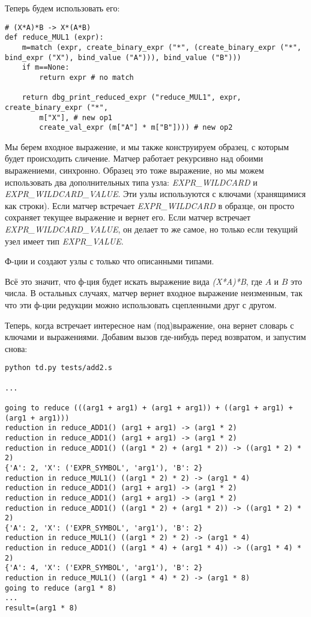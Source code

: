Теперь будем использовать его:

\begin{lstlisting}
# (X*A)*B -> X*(A*B)
def reduce_MUL1 (expr):
    m=match (expr, create_binary_expr ("*", (create_binary_expr ("*", bind_expr ("X"), bind_value ("A"))), bind_value ("B")))
    if m==None:
        return expr # no match

    return dbg_print_reduced_expr ("reduce_MUL1", expr, create_binary_expr ("*", 
        m["X"], # new op1
        create_val_expr (m["A"] * m["B"]))) # new op2
\end{lstlisting}

Мы берем входное выражение, и мы также конструируем образец, с которым будет происходить сличение.
Матчер работает рекурсивно над обоими выражениеми, синхронно.
Образец это тоже выражение, но мы можем использовать два дополнительных типа узла: \textit{EXPR\_WILDCARD} и
\textit{EXPR\_WILDCARD\_VALUE}. Эти узлы используются с ключами (хранящимися как строки).
Если матчер встречает \textit{EXPR\_WILDCARD} в образце, он просто сохраняет текущее выражение и вернет его.
Если матчер встречает \textit{EXPR\_WILDCARD\_VALUE}, он делает то же самое, но только если текущий узел имеет тип
\textit{EXPR\_VALUE}.

Ф-ции  и  создают узлы с только что описанными типами.

Всё это значит, что ф-ция  будет искать выражение вида \textit{(X*A)*B}, где $A$ и $B$
это числа. В остальных случаях, матчер вернет входное выражение неизменным, так что эти ф-ции редукции можно использовать
сцепленными друг с другом.

Теперь, когда  встречает интересное нам (под)выражение,
она вернет словарь с ключами и выражениями.
Добавим вызов  где-нибудь перед возвратом, и запустим снова:

\begin{lstlisting}
python td.py tests/add2.s

...

going to reduce (((arg1 + arg1) + (arg1 + arg1)) + ((arg1 + arg1) + (arg1 + arg1)))
reduction in reduce_ADD1() (arg1 + arg1) -> (arg1 * 2)
reduction in reduce_ADD1() (arg1 + arg1) -> (arg1 * 2)
reduction in reduce_ADD1() ((arg1 * 2) + (arg1 * 2)) -> ((arg1 * 2) * 2)
{'A': 2, 'X': ('EXPR_SYMBOL', 'arg1'), 'B': 2}
reduction in reduce_MUL1() ((arg1 * 2) * 2) -> (arg1 * 4)
reduction in reduce_ADD1() (arg1 + arg1) -> (arg1 * 2)
reduction in reduce_ADD1() (arg1 + arg1) -> (arg1 * 2)
reduction in reduce_ADD1() ((arg1 * 2) + (arg1 * 2)) -> ((arg1 * 2) * 2)
{'A': 2, 'X': ('EXPR_SYMBOL', 'arg1'), 'B': 2}
reduction in reduce_MUL1() ((arg1 * 2) * 2) -> (arg1 * 4)
reduction in reduce_ADD1() ((arg1 * 4) + (arg1 * 4)) -> ((arg1 * 4) * 2)
{'A': 4, 'X': ('EXPR_SYMBOL', 'arg1'), 'B': 2}
reduction in reduce_MUL1() ((arg1 * 4) * 2) -> (arg1 * 8)
going to reduce (arg1 * 8)
...
result=(arg1 * 8)
\end{lstlisting}

